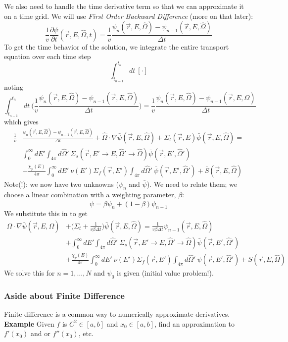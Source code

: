 \documentclass[12pt]{article}
\newcommand{\rvec}{\ensuremath{\vec{r}}}
\newcommand{\omvec}{\ensuremath{\hat{\Omega}}}
\newcommand{\vOmega}{\ensuremath{\hat{\Omega}}}
\begin{document}
We also need to handle the time derivative term so that we can approximate it on a time grid. We will use \textit{First Order Backward Difference} (more on that later): 
\[
\frac{1}{v} \frac{\partial \psi}{\partial t}(\rvec,E,\omvec,t) = \frac{1}{v}\frac{\psi_n(\vec{r}, E ,\vOmega) - \psi_{n-1}(\vec{r}, E ,\vOmega)}{\Delta t}
\]
To get the time behavior of the solution, we integrate the entire transport equation over each time step
\[
\int_{t_{n-1}}^{t_n} dt\: [\cdot]
\]
noting
\[
\int_{t_{n-1}}^{t_n} dt\: \bigl(\frac{1}{v}\frac{\psi_n(\vec{r}, E ,\vOmega) - \psi_{n-1}(\vec{r}, E ,\vOmega)}{\Delta t}\bigr) = \frac{1}{v}\frac{\psi_n(\vec{r}, E ,\vOmega) - \psi_{n-1}(\vec{r}, E ,\vOmega)}{\Delta t}
\]
which gives
\begin{align*}
\frac{1}{v}&\frac{\psi_n(\vec{r}, E ,\vOmega) - \psi_{n-1}(\vec{r}, E ,\vOmega)}{\Delta t} 
+ \omvec\cdot  \nabla  \bar{\psi}(\vec{r}, E ,\vOmega) 
+ \Sigma_t(\rvec,E)\bar{\psi}(\vec{r}, E ,\vOmega) 
= \\& \int_0^{\infty}dE'\int_{4\pi}d\omvec'\: \Sigma_s(\rvec, E'\rightarrow E,\omvec'\rightarrow\omvec) \bar{\psi}(\vec{r}, E' ,\vOmega')
\\&+ \frac{\chi_p(E)}{4\pi}\int_0^{\infty}dE'\:\nu(E')\Sigma_f(\rvec,E')\int_{4\pi}d\omvec'\:
\bar{\psi}(\vec{r}, E' ,\vOmega')
+\bar{S}(\rvec, E, \omvec)
\end{align*}
Note(!): we now have two unknowns ($\psi_n$ and $\bar{\psi}$). We need to relate them; we choose a linear combination with a weighting parameter, $\beta$:
\[
\bar{\psi} = \beta \psi_n + (1 - \beta)\psi_{n-1}
\]
We substitute this in to get
\begin{align*}
\omvec\cdot  \nabla  \bar{\psi}(\vec{r}, E ,\vOmega) 
&+ \bigl(\Sigma_t + \frac{1}{v \beta \Delta t}\bigr)\bar{\psi}(\vec{r}, E ,\vOmega) 
=  \frac{1}{v \beta \Delta t} \psi_{n-1}(\vec{r}, E ,\vOmega) \\
&+ \int_0^{\infty}dE'\int_{4\pi}d\omvec'\: \Sigma_s(\rvec, E'\rightarrow E,\omvec'\rightarrow\omvec) \bar{\psi}(\vec{r}, E' ,\vOmega')
\\&+ \frac{\chi_p(E)}{4\pi}\int_0^{\infty}dE'\:\nu(E')\Sigma_f(\rvec,E')\int_{4\pi}d\omvec'\:
\bar{\psi}(\vec{r}, E' ,\vOmega')
+\bar{S}(\rvec, E, \omvec)
\end{align*}
We solve this for $n=1, \dots, N$ and $\psi_0$ is given (initial value problem!).

\subsubsection*{Aside about Finite Difference}
Finite difference is a common way to numerically approximate derivatives.  \textbf{Example} Given $f$ is $ C^2 \in [a,b]$ and $x_0 \in [a,b]$, find an approximation to $f'(x_0)$ and or $f''(x_0)$, etc.
\end{document}
